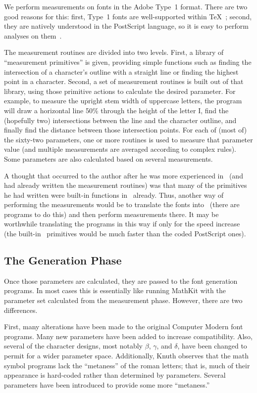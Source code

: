 \documentclass[preprint]{ltugproc}
\begin{document}
We perform measurements on fonts in the Adobe Type~1 format. There are two good
reasons for this: first, Type~1 fonts are well-supported within
\TeX~\cite{lehman}; second, they are natively understood in the PostScript
language, so it is easy to perform analyses on them~\cite{plrm}.

The measurement routines are divided into two levels. First, a library of
``measurement primitives'' is given, providing simple functions such as finding
the intersection of a character's outline with a straight line or finding the
highest point in a character. Second, a set of measurement routines is built out
of that library, using those primitive actions to calculate the desired
parameter. For example, to measure the upright stem width of uppercase letters,
the program will draw a horizontal line 50\% through the height of the letter I,
find the (hopefully two) intersections between the line and the character
outline, and finally find the distance between those intersection points. For
each of (most of) the sixty-two parameters, one or more routines is used to
measure that parameter value (and multiple measurements are averaged according
to complex rules). Some parameters are also calculated based on several
measurements.

A thought that occurred to the author after he was more experienced in \MF\ (and
had already written the measurement routines) was that many of the primitives he
had written were built-in functions in \MF\ already. Thus, another way of
performing the measurements would be to translate the fonts into \MF\ (there are
programs to do this) and then perform measurements there. It may be worthwhile
translating the programs in this way if only for the speed increase (the
built-in \MF\ primitives would be much faster than the coded PostScript ones).

\subsection{The Generation Phase}

Once those parameters are calculated, they are passed to the font generation
programs. In most cases this is essentially like running MathKit with the
parameter set calculated from the measurement phase. However, there are two
differences.

First, many alterations have been made to the original Computer Modern font
programs. Many new parameters have been added to increase compatibility. Also,
several of the character designs, most notably $\beta$, $\gamma$, and $\delta$,
have been changed to permit for a wider parameter space. Additionally, Knuth
observes that the math symbol programs lack the ``metaness'' of the roman
letters; that is, much of their appearance is hard-coded rather than
determined by parameters. Several parameters have been introduced to provide
some more ``metaness.''
\end{document}
